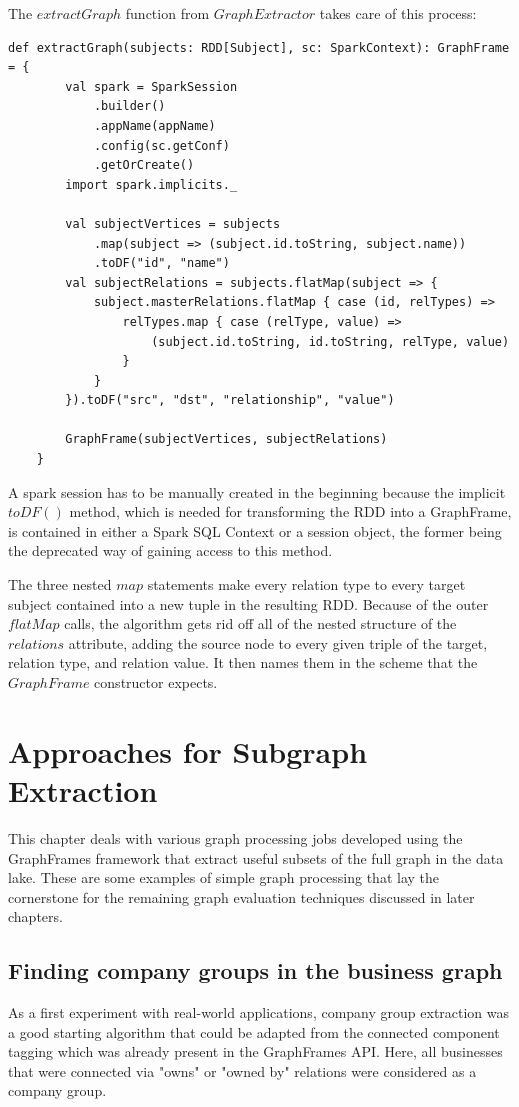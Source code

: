 \documentclass[
        a4paper,     %
        titlepage,   %
        oneside,     %
        parskip      %
        ]{scrartcl}  %
\begin{document}
    The $extractGraph$ function from $GraphExtractor$ takes care of this process:

    \begin{lstlisting}[style=scalaStyle,caption=extractGraph in $GraphExtractor$]
    def extractGraph(subjects: RDD[Subject], sc: SparkContext): GraphFrame = {
  		val spark = SparkSession
  			.builder()
  			.appName(appName)
  			.config(sc.getConf)
  			.getOrCreate()
  		import spark.implicits._

  		val subjectVertices = subjects
  			.map(subject => (subject.id.toString, subject.name))
  			.toDF("id", "name")
  		val subjectRelations = subjects.flatMap(subject => {
  			subject.masterRelations.flatMap { case (id, relTypes) =>
  				relTypes.map { case (relType, value) =>
  					(subject.id.toString, id.toString, relType, value)
  				}
  			}
  		}).toDF("src", "dst", "relationship", "value")

  		GraphFrame(subjectVertices, subjectRelations)
  	}
    \end{lstlisting}

    A spark session has to be manually created in the beginning because the implicit $toDF()$ method,
    which is needed for transforming the RDD into a GraphFrame, is contained in either a
    Spark SQL Context or a session object, the former being the deprecated way of gaining access to this method.

    The three nested $map$ statements make every relation type to every target subject
    contained into a new tuple in the resulting RDD. Because of the outer $flatMap$
    calls, the algorithm gets rid off all of the nested structure of the $relations$
    attribute, adding the source node to every given triple of the target, relation type, and relation value.
    It then names them in the scheme that the $GraphFrame$ constructor expects.
    \pagebreak

  \section{Approaches for Subgraph Extraction}
  This chapter deals with various graph processing jobs developed using the
  GraphFrames framework that extract useful subsets of the full graph in the data lake.
  These are some examples of simple graph processing that lay the cornerstone
  for the remaining graph evaluation techniques discussed in later chapters.

  \subsection{Finding company groups in the business graph}
  As a first experiment with real-world applications, company group extraction
  was a good starting algorithm that could be adapted from the connected component
  tagging which was already present in the GraphFrames API.
  Here, all businesses that were connected via "owns" or "owned by"
  relations were considered as a company group.
\end{document}
